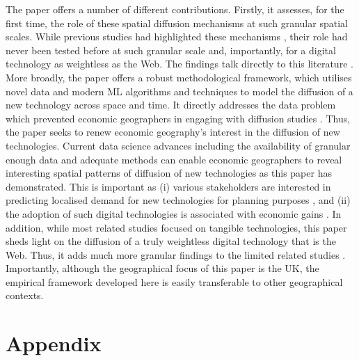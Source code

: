 \documentclass[
  authoryear,
  preprint,
  3p]{elsarticle}
\begin{document}
The paper offers a number of different contributions. Firstly, it
assesses, for the first time, the role of these spatial diffusion
mechanisms at such granular spatial scales. While previous studies had
highlighted these mechanisms
\citep{hagerstrand1968innovation, rogers2010diffusion, grubler1990rise},
their role had never been tested before at such granular scale and,
importantly, for a digital technology as weightless as the Web. The
findings talk directly to this literature
\citep[e.g.][]{beardsell1999spatial, haller2011determinants, lengyel2020role}.
More broadly, the paper offers a robust methodological framework, which
utilises novel data and modern ML algorithms and techniques to model the
diffusion of a new technology across space and time. It directly
addresses the data problem which prevented economic geographers in
engaging with diffusion studies
\citep{iso2005, kemeny2011international, zook2022mapping}. Thus, the
paper seeks to renew economic geography's interest in the diffusion of
new technologies. Current data science advances including the
availability of granular enough data and adequate methods can enable
economic geographers to reveal interesting spatial patterns of diffusion
of new technologies as this paper has demonstrated. This is important as
(i) various stakeholders are interested in predicting localised demand
for new technologies for planning purposes
\citep{leibowicz2016representing, meade2021modelling}, and (ii) the
adoption of such digital technologies is associated with economic gains
\citep{solow1957technical, aghion1990model, kemeny2011international, tranosuk, capello2024nexus}.
In addition, while most related studies focused on tangible
technologies, this paper sheds light on the diffusion of a truly
weightless digital technology that is the Web. Thus, it adds much more
granular findings to the limited related studies
\citep{sinai2004geography, haller2011determinants}. Importantly,
although the geographical focus of this paper is the UK, the empirical
framework developed here is easily transferable to other geographical
contexts.

\setcounter{section}{0}
\renewcommand{\thesection}{\Alph{section}}

\setcounter{table}{0}
\renewcommand{\thetable}{A\arabic{table}}

\setcounter{figure}{0}
\renewcommand{\thefigure}{A\arabic{figure}}

\section{Appendix}\label{appendix}
\end{document}
